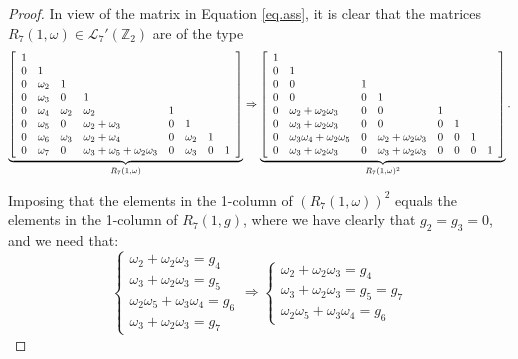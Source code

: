 \documentclass[preprint,12pt]{elsarticle}
\begin{document}
\begin{proof} 
In view of the matrix in Equation \eqref{eq.ass}, it is clear that the matrices $R_{7}(1,\omega) \in \mathcal L_7'(\mathbb Z_2)$ are of the type
\begin{eqnarray*} 
\underbrace{\left[\begin{array}{l l l l l l l l} 1& & & & & & & \\ 0& 1& & & & & & \\
0&\omega_2 &1 & & & & & \\
0&\omega_3 &0 &1 & & & & \\
0& \omega_4&\omega_2 & \omega_2&1 & & & \\
0&\omega_5 &0 &\omega_2+\omega_3 & 0&1 & & \\
0&\omega_6 & \omega_3&\omega_2+\omega_4 & 0 & \omega_2&1 & \\
0&\omega_7 &0 &\omega_3+\omega_5+\omega_2\omega_3 &0 &\omega_3 & 0&1 \\
 \end{array}\right]}_{R_{7}(1,\omega)} \Rightarrow 
\underbrace{\left[\begin{array}{l l l l l l l l} 
1& & & & & & & \\ 
0& 1& & & & & & \\
0& 0 &1 & & & & & \\
0&0 &0 &1 & & & & \\
0& \omega_{2} + \omega_2 \omega_3& 0 & 0&1 & & & \\
0&\omega_{3} + \omega_2 \omega_3 &0 &0 & 0&1 & & \\
0& \omega_3 \omega_4 + \omega_2 \omega_5 & 0 & \omega_{2} + \omega_2 \omega_3 & 0 & 0&1 & \\
0&\omega_{3} + \omega_2 \omega_{3}&0 & \omega_{3} + \omega_{2}\omega_{3} &0 &0 & 0&1 \\
\end{array}\right]}_{R_{7}(1,\omega)^2}  .\end{eqnarray*} 

\noindent Imposing that the elements in the 1-column of $(R_7(1,\omega))^2$ equals the elements in the 1-column of $R_7(1,g)$, where we have clearly that $g_2 = g_3 = 0$, and we need that:
$$\begin{cases}\omega_2+\omega_2\omega_3=g_4\\ 
\omega_3+\omega_2\omega_3=g_5 \\
\omega_2\omega_5+\omega_3\omega_4=g_6 \\
\omega_3+\omega_2\omega_3=g_7\end{cases} \Longrightarrow \begin{cases}\omega_2+\omega_2\omega_3=g_4\\ 
\omega_3+\omega_2\omega_3=g_5=g_7 \\
\omega_2\omega_5+\omega_3\omega_4=g_6 \end{cases}$$


\end{proof}
\end{document}
